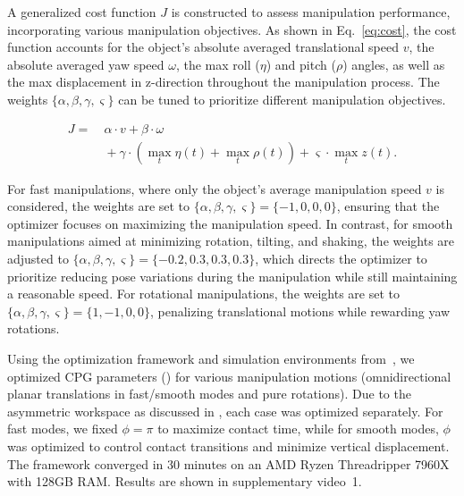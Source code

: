 A generalized cost function $J$ is constructed to assess manipulation performance, incorporating various manipulation objectives. As shown in Eq.~\eqref{eq:cost}, the cost function accounts for the object's absolute averaged translational speed $v$, the absolute averaged yaw speed $\omega$, the max roll ($\eta$) and pitch ($\rho$) angles, as well as the max displacement in z-direction throughout the manipulation process. The weights $\{\alpha, \beta, \gamma, \varsigma\}$ can be tuned to prioritize different manipulation objectives.

\begin{equation}
\begin{split}
J = &\ \alpha \cdot v + \beta \cdot \omega\\
    &\ + \gamma \cdot \left( \max_{t} \eta(t) + \max_{t} \rho(t) \right) + \varsigma \cdot \max_{t} z(t).
\label{eq:cost}
\end{split}
\end{equation}

For fast manipulations, where only the object's average manipulation speed $v$ is considered, the weights are set to $\{\alpha, \beta, \gamma, \varsigma \} = \{-1, 0, 0, 0\}$, ensuring that the optimizer focuses on maximizing the manipulation speed. In contrast, for smooth manipulations aimed at minimizing rotation, tilting, and shaking, the weights are adjusted to $\{\alpha, \beta, \gamma, \varsigma \} = \{-0.2, 0.3, 0.3, 0.3\}$, which directs the optimizer to prioritize reducing pose variations during the manipulation while still maintaining a reasonable speed. For rotational manipulations, the weights are set to $\{\alpha, \beta, \gamma, \varsigma \} = \{1, -1, 0, 0\}$, penalizing translational motions while rewarding yaw rotations. 

Using the optimization framework and simulation environments from~, we optimized CPG parameters () for various manipulation motions (omnidirectional planar translations in fast/smooth modes and pure rotations). Due to the asymmetric workspace as discussed in , each case was optimized separately. For fast modes, we fixed $\phi=\pi$ to maximize contact time, while for smooth modes, $\phi$ was optimized to control contact transitions and minimize vertical displacement. The framework converged in 30 minutes on an AMD Ryzen Threadripper 7960X with 128GB RAM. Results are shown in supplementary video~1.

